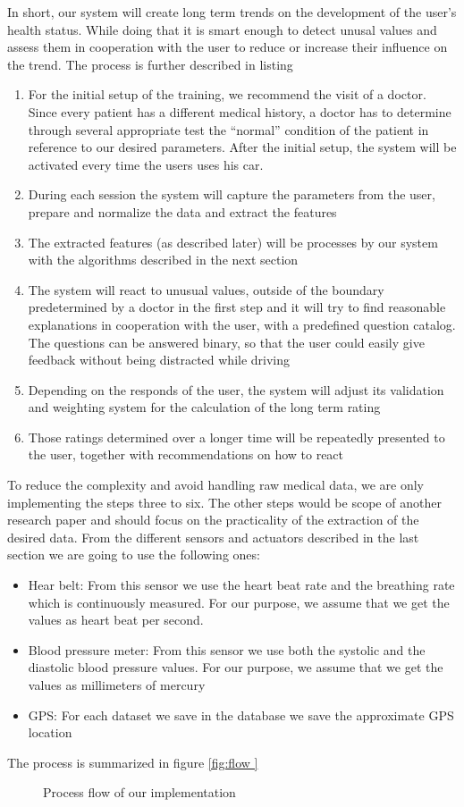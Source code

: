 In short, our system will create long term trends on the development of the user's health status. While doing that it is smart enough to detect unusal values and assess them in cooperation with the user to reduce or increase their influence on the trend.
The process is further described in listing
\begin{enumerate}
	\item For the initial setup of the training, we recommend the visit of a doctor. Since every patient has a different medical history, a doctor has to determine through several appropriate test the ``normal'' condition of the patient in reference to our desired parameters. After the initial setup, the system will be activated every time the users uses his car.
	\item During each session the system will capture the parameters from the user, prepare and normalize the data and extract the features
	\item The extracted features (as described later) will be processes by our system with the algorithms described in the next section
	\item The system will react to unusual values, outside of the boundary predetermined by a doctor in the first step and it will try to find reasonable explanations in cooperation with the user, with a predefined question catalog. The questions can be answered binary, so that the user could easily give feedback without being distracted while driving 
	\item Depending on the responds of the user, the system will adjust its validation and weighting system for the calculation of the long term rating
	\item Those ratings determined over a longer time will be repeatedly presented to the user, together with recommendations on how to react 
\end{enumerate}

To reduce the complexity and avoid handling raw medical data, we are only implementing the steps three to six. The other steps would be scope of another research paper and should focus on the practicality of the extraction of the desired data.
From the different sensors and actuators described in the last section we are going to use the following ones:
\begin{itemize}
	\item Hear belt: From this sensor we use the heart beat rate and the breathing rate which is continuously measured. For our purpose, we assume that we get the values as heart beat per second.
	\item Blood pressure meter: From this sensor we use both the systolic and the diastolic blood pressure values. For our purpose, we assume that we get the values as millimeters of mercury
	\item GPS: For each dataset we save in the database we save the approximate GPS location
\end{itemize}
The process is summarized in figure \ref{fig:flow }
\begin{figure}
	\caption{Process flow of our implementation}
	\label{fig:flow}
\end{figure}

